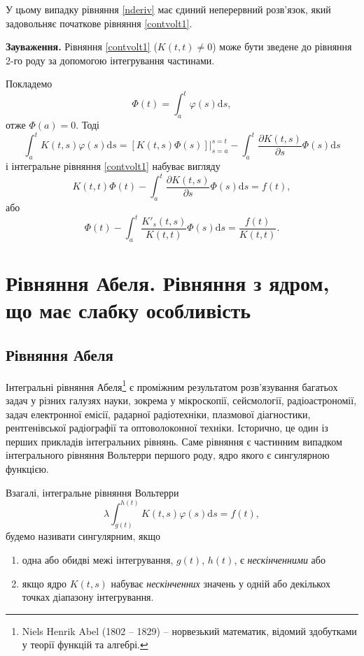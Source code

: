 \documentclass[14pt,twoside]{extreport}
\theoremstyle{mystyle}
\numberwithin{equation}{chapter}
\begin{document}
У цьому випадку рівняння \eqref{nderiv} має єдиний неперервний розв'язок, який задовольняє початкове рівняння \eqref{contvolt1}.

\textbf{Зауваження.} Рівняння \eqref{contvolt1} ($K(t, t) \neq 0$) може бути зведене до рівняння 2-го роду за допомогою інтегрування частинами.

Покладемо
\begin{equation}
\Phi(t) = \int_{a}^{t} \varphi(s) \mathrm{d}s,
\end{equation}
отже $\Phi(a) =0$. Тоді
\[
\int_{a}^{t} K(t, s) \varphi(s) \mathrm{d}s = \left.[K(t, s) \Phi(s)]\right|_{s=a}^{s=t} - \int_{a}^{t} \frac{\partial K(t, s)}{\partial s} \Phi(s) \mathrm{d}s
\]
і інтегральне рівняння \eqref{contvolt1} набуває вигляду
\[
K(t, t) \Phi(t) - \int_{a}^{t} \frac{\partial K(t, s)}{\partial s} \Phi(s) \mathrm{d}s = f(t),
\]
або
\begin{equation}
\Phi(t) - \int_{a}^{t} \frac{K'_s(t, s)}{K(t, t)} \Phi(s) \mathrm{d}s = \frac{f(t)}{K(t, t)}.
\end{equation}

\chapter{Рівняння Абеля. Рівняння з ядром, що має слабку особливість}

\section{Рівняння Абеля}

Інтегральні рівняння Абеля\footnote{Niels Henrik Abel (1802 -- 1829) -- норвезький математик, відомий здобутками у теорії функцій та алгебрі.} є проміжним результатом розв'язування багатьох задач у різних галузях науки, зокрема у мікроскопії, сейсмології, радіоастрономії, задач електронної емісії, радарної радіотехніки, плазмової діагностики, рентгенівської радіографії та оптоволоконної техніки. Історично, це один із перших прикладів інтегральних рівнянь. Саме рівняння є частинним випадком інтегрального рівняння Вольтерри першого роду, ядро якого є сингулярною функцією.

Взагалі, інтегральне рівняння Вольтерри
\begin{equation}\label{singinteq}
	\displaystyle \lambda\int_{g(t)}^{h(t)}K(t, s)\varphi(s)\mathrm{d}s = f(t),
\end{equation}
 будемо називати сингулярним, якщо
\begin{enumerate}
	\item одна або обидві межі інтегрування, $g(t)$, $h(t)$, є \emph{нескінченними} або
	
	\item якщо ядро $K(t, s)$ набуває \emph{нескінченних} значень у одній або декількох точках діапазону інтегрування.
\end{enumerate}
\end{document}
